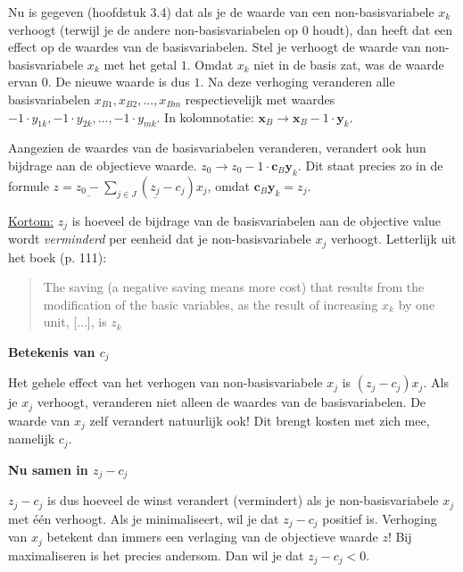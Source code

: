 \documentclass[10pt,a4paper]{article}
\begin{document}
\begin{description}
Nu is gegeven (hoofdstuk 3.4) dat als je de waarde van een non-basisvariabele $x_k$ verhoogt (terwijl je de andere non-basisvariabelen op 0 houdt), dan heeft dat een effect op de waardes van de basisvariabelen. 
Stel je verhoogt de waarde van non-basisvariabele $x_k$ met het getal $1$. Omdat $x_k$ niet in de basis zat, was de waarde ervan $0$. De nieuwe waarde is dus $1$. Na deze verhoging veranderen alle basisvariabelen $x_{B1}, x_{B2}, ..., x_{Bm}$ respectievelijk met waardes $-1 \cdot y_{1k}, -1 \cdot y_{2k}, ..., -1 \cdot y_{mk}$. In kolomnotatie: $\textbf{x}_B \rightarrow \textbf{x}_B - 1 \cdot \textbf{y}_k$. 

Aangezien de waardes van de basisvariabelen veranderen, verandert ook hun bijdrage aan de objectieve waarde. $z_0 \rightarrow z_0 - 1 \cdot \textbf{c}_B \textbf{y}_k$. Dit staat precies zo in de formule $z = \underline{z_0 -} \displaystyle\sum\limits_{j \in J} (\underline{z_j} - c_j)x_j$, omdat $\textbf{c}_B \textbf{y}_k = z_j$.

\underline{Kortom:} $z_j$ is hoeveel de bijdrage van de basisvariabelen aan de objective value wordt \textit{verminderd} per eenheid dat je non-basisvariabele $x_j$ verhoogt. Letterlijk uit het boek (p. 111):
\begin{quote}
	The saving (a negative saving means more cost) that results from the modification of the basic variables, as the result of increasing $x_k$ by one unit, [...], is $z_k$
\end{quote}

\textbf{Betekenis van $c_j$}

Het gehele effect van het verhogen van non-basisvariabele $x_j$ is $(z_j - c_j) x_j$. Als je $x_j$ verhoogt, veranderen niet alleen de waardes van de basisvariabelen. De waarde van $x_j$ zelf verandert natuurlijk ook! Dit brengt kosten met zich mee, namelijk $c_j$. 

\textbf{Nu samen in $z_j - c_j$}


$z_j - c_j$ is dus hoeveel de winst verandert (vermindert) als je non-basisvariabele $x_j$ met één verhoogt. Als je minimaliseert, wil je dat $z_j - c_j$ positief is. Verhoging van $x_j$ betekent dan immers een verlaging van de objectieve waarde $z$! Bij maximaliseren is het precies andersom. Dan wil je dat $z_j - c_j < 0$. 

\end{description}
\end{document}
